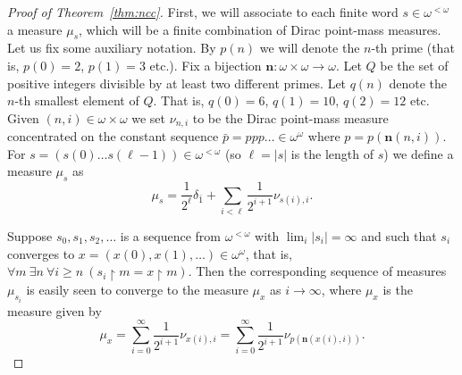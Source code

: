 \documentclass{amsart}
\theoremstyle{definition}
\newcommand{\res}{\restriction}
\newcommand{\ww}{\omega^\omega}
\begin{document}
\begin{proof}[Proof of Theorem~\ref{thm:ncc}]
First, we will associate to each finite word $s\in\omega^{<\omega}$
a measure $\mu_s$, which will be a
finite combination of Dirac point-mass measures.
Let us fix some auxiliary notation. By $p(n)$ we will denote the $n$-th prime
(that is, $p(0)=2$, $p(1)=3$ etc.). Fix a bijection
$\mathbf{n}\colon\omega\times\omega\to\omega$. Let $Q$ be the set of
positive integers divisible by at least two different primes.
Let $q(n)$ denote the $n$-th smallest element of $Q$. That is, $q(0)=6$, $q(1)=10$, $q(2)=12$ etc.\
Given $(n,i)\in\omega\times\omega$ we set $\nu_{n,i}$ to be the Dirac point-mass
measure concentrated on the constant sequence $\bar p=ppp\ldots\in\omega^\omega$
where $p=p(\mathbf{n}(n,i))$.
For $s=(s(0)\ldots s(\ell-1))\in\omega^{<\omega}$ (so $\ell=|s|$ is the length of $s$)
we define a measure $\mu_s$ as
\[
\mu_s=\frac{1}{2^\ell}\delta_{\bar{1}}+\sum_{i<\ell} \frac{1}{2^{i+1}}\nu_{s(i),i}.
\]

Suppose $s_0, s_1, s_2,\dots$ is a sequence from $\omega^{<\omega}$
with $\lim_i |s_i|=\infty$ and such that $s_i$ converges to $x=(x(0),x(1),\dots) \in \ww$,
that is, $\forall m\ \exists n\ \forall i\geq n\ (s_i\res m=x\res m)$.
Then
the corresponding sequence of measures $\mu_{s_i}$ is easily seen to converge to the
measure $\mu_{x}$ as $i\to\infty$,  where $\mu_x$ is the measure given by
\[
\mu_{x}=\sum_{i=0}^\infty\frac{1}{2^{i+1}}\nu_{x(i),i}=
\sum_{i=0}^\infty\frac{1}{2^{i+1}}\nu_{p(\mathbf{n}(x(i),i))}.
\]


\end{proof}
\end{document}
